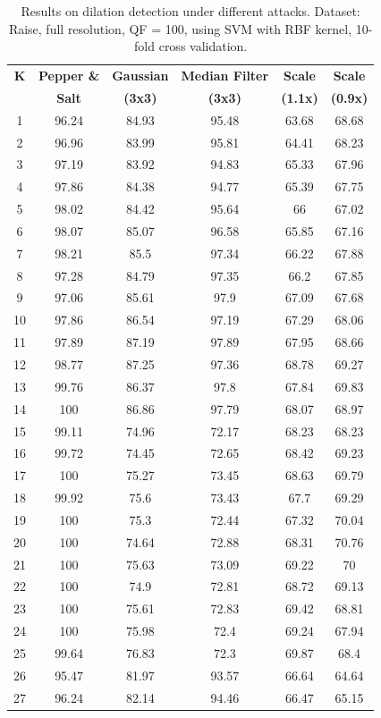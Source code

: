 \documentclass[review]{elsarticle}
\begin{document}
\begin{table}[!t]
	\centering
	\caption{Results on dilation detection under different attacks. Dataset: Raise, full resolution, QF = 100, using SVM with RBF kernel, 10-fold cross validation.}
	\label{table:attacks}
	\begin{tabular}{c|ccccc}
		\hline\hline
		\textbf{K} & \textbf{Pepper \&}&\textbf{Gaussian }&\textbf{Median Filter}&\textbf{Scale}&\textbf{Scale}\\
		& \textbf{Salt}&\textbf{(3x3)}&\textbf{(3x3)}&\textbf{(1.1x)}&\textbf{(0.9x)}\\
		\hline
		1&96.24&84.93&95.48&63.68&68.68\\
		2&96.96&83.99&95.81&64.41&68.23\\
		3&97.19&83.92&94.83&65.33&67.96\\
		4&97.86&84.38&94.77&65.39&67.75\\
		5&98.02&84.42&95.64&66&67.02\\
		6&98.07&85.07&96.58&65.85&67.16\\
		7&98.21&85.5&97.34&66.22&67.88\\
		8&97.28&84.79&97.35&66.2&67.85\\
		9&97.06&85.61&97.9&67.09&67.68\\
		10&97.86&86.54&97.19&67.29&68.06\\
		11&97.89&87.19&97.89&67.95&68.66\\
		12&98.77&87.25&97.36&68.78&69.27\\
		13&99.76&86.37&97.8&67.84&69.83\\
		14&100&86.86&97.79&68.07&68.97\\
		15&99.11&74.96&72.17&68.23&68.23\\
		16&99.72&74.45&72.65&68.42&69.23\\
		17&100&75.27&73.45&68.63&69.79\\
		18&99.92&75.6&73.43&67.7&69.29\\
		19&100&75.3&72.44&67.32&70.04\\
		20&100&74.64&72.88&68.31&70.76\\
		21&100&75.63&73.09&69.22&70\\
		22&100&74.9&72.81&68.72&69.13\\
		23&100&75.61&72.83&69.42&68.81\\
		24&100&75.98&72.4&69.24&67.94\\
		25&99.64&76.83&72.3&69.87&68.4\\
		26&95.47&81.97&93.57&66.64&64.64\\
		27&96.24&82.14&94.46&66.47&65.15\\

\end{tabular}
\end{table}
\end{document}
